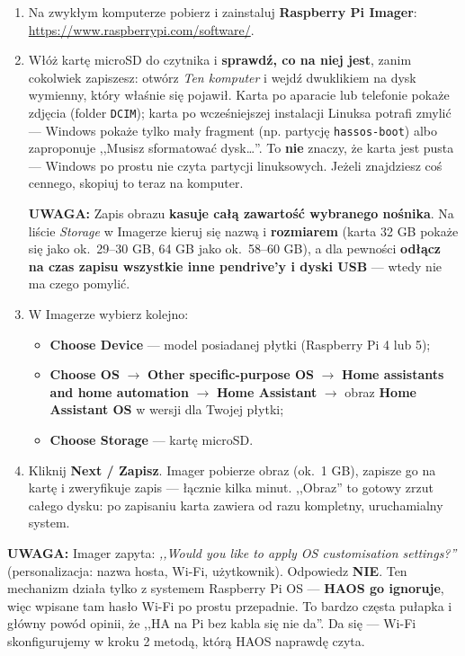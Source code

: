 \documentclass[11pt,a4paper]{article}
\newcommand{\uwaga}[1]{\par\medskip\noindent\textcolor{warnred}{\textbf{UWAGA:}} #1\par\medskip}
\begin{document}
\begin{enumerate}
\item Na zwykłym komputerze pobierz i zainstaluj \textbf{Raspberry Pi Imager}: \url{https://www.raspberrypi.com/software/}.
\item Włóż kartę microSD do czytnika i \textbf{sprawdź, co na niej jest}, zanim cokolwiek zapiszesz: otwórz \emph{Ten komputer} i wejdź dwuklikiem na dysk wymienny, który właśnie się pojawił. Karta po aparacie lub telefonie pokaże zdjęcia (folder \texttt{DCIM}); karta po wcześniejszej instalacji Linuksa potrafi zmylić --- Windows pokaże tylko mały fragment (np. partycję \texttt{hassos-boot}) albo zaproponuje ,,Musisz sformatować dysk\ldots''. To \textbf{nie} znaczy, że karta jest pusta --- Windows po prostu nie czyta partycji linuksowych. Jeżeli znajdziesz coś cennego, skopiuj to teraz na komputer.
\uwaga{Zapis obrazu \textbf{kasuje całą zawartość wybranego nośnika}. Na liście \emph{Storage} w Imagerze kieruj się nazwą i \textbf{rozmiarem} (karta 32 GB pokaże się jako ok.\ 29--30 GB, 64 GB jako ok.\ 58--60 GB), a dla pewności \textbf{odłącz na czas zapisu wszystkie inne pendrive'y i dyski USB} --- wtedy nie ma czego pomylić.}
\item W Imagerze wybierz kolejno:
  \begin{itemize}
  \item \textbf{Choose Device} --- model posiadanej płytki (Raspberry Pi 4 lub 5);
  \item \textbf{Choose OS} $\to$ \textbf{Other specific-purpose OS} $\to$ \textbf{Home assistants and home automation} $\to$ \textbf{Home Assistant} $\to$ obraz \textbf{Home Assistant OS} w wersji dla Twojej płytki;
  \item \textbf{Choose Storage} --- kartę microSD.
  \end{itemize}
\item Kliknij \textbf{Next / Zapisz}. Imager pobierze obraz (ok.~1 GB), zapisze go na kartę i zweryfikuje zapis --- łącznie kilka minut. ,,Obraz'' to gotowy zrzut całego dysku: po zapisaniu karta zawiera od razu kompletny, uruchamialny system.
\end{enumerate}

\uwaga{Imager zapyta: \emph{,,Would you like to apply OS customisation settings?''} (personalizacja: nazwa hosta, Wi-Fi, użytkownik). Odpowiedz \textbf{NIE}. Ten mechanizm działa tylko z systemem Raspberry Pi OS --- \textbf{HAOS go ignoruje}, więc wpisane tam hasło Wi-Fi po prostu przepadnie. To bardzo częsta pułapka i główny powód opinii, że ,,HA na Pi bez kabla się nie da''. Da się --- Wi-Fi skonfigurujemy w kroku 2 metodą, którą HAOS naprawdę czyta.}
\end{document}
